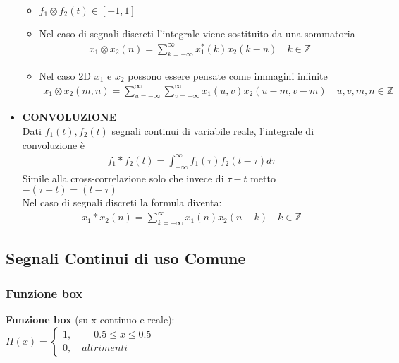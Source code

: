 \begin{itemize}
\begin{itemize}
                \item $f_1\bar{\otimes}f_2(t)\in[-1,1]$
                \item Nel caso di segnali discreti l'integrale viene sostituito da una sommatoria
                \begin{align*}
                    x_1\otimes x_2(n)=\sum_{k=-\infty}^{\infty} x^{*}_{1}(k)x_{2}(k-n)\quad k\in\mathbb{Z}
                \end{align*}
                \item Nel caso 2D $x_1$ e $x_2$ possono essere pensate come immagini infinite
                \begin{align*}
                    x_1\otimes x_2(m,n)=\sum_{u=-\infty}^{\infty}\sum_{v=-\infty}^{\infty} x_{1}(u,v)x_{2}(u-m,v-m)\quad u,v,m,n\in\mathbb{Z}
                \end{align*}
            \end{itemize}
        \item \textbf{CONVOLUZIONE}\\
        Dati $f_1(t), f_2(t)$ segnali continui di variabile reale, l'integrale di convoluzione è
        \begin{align*}
            f_1\ast f_2(t)=\int_{-\infty}^{\infty}f_1(\tau)f_2(t-\tau)d\tau
        \end{align*}
        Simile alla cross-correlazione solo che invece di $\tau-t$ metto $-(\tau-t)=(t-\tau)$\\
        Nel caso di segnali discreti la formula diventa:
        \begin{align*}
            x_1\ast x_2(n)=\sum_{k=-\infty}^{\infty}x_1(n)x_2(n-k)\quad k\in\mathbb{Z}
        \end{align*}
    \end{itemize}
    \subsection{Segnali Continui di uso Comune}
    \subsubsection{Funzione box}
    \textbf{Funzione box} (su x continuo e reale):\\
    $\Pi(x)=\begin{cases}
        1, \quad -0.5\leq x\leq 0.5\\
        0, \quad altrimenti
    \end{cases}$\\
    
